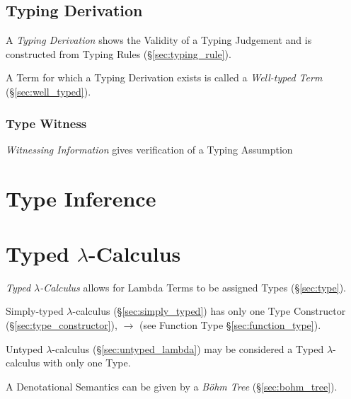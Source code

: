 \subsection{Typing Derivation}\label{sec:typing_derivation}

A \emph{Typing Derivation} shows the Validity of a Typing Judgement
and is constructed from Typing Rules (\S\ref{sec:typing_rule}).

A Term for which a Typing Derivation exists is called a
\emph{Well-typed Term} (\S\ref{sec:well_typed}).



\subsubsection{Type Witness}\label{sec:type_witness}

\emph{Witnessing Information} gives verification of a Typing
Assumption



\section{Type Inference}\label{sec:type_inference}



\section{Typed $\lambda$-Calculus}\label{sec:typed_lambda}

\emph{Typed $\lambda$-Calculus} allows for Lambda Terms to be assigned
Types (\S\ref{sec:type}).

Simply-typed $\lambda$-calculus (\S\ref{sec:simply_typed}) has only
one Type Constructor (\S\ref{sec:type_constructor}), $\rightarrow$
(see Function Type \S\ref{sec:function_type}).

Untyped $\lambda$-calculus (\S\ref{sec:untyped_lambda}) may be
considered a Typed $\lambda$-calculus with only one Type.

A Denotational Semantics can be given by a \emph{B\"ohm Tree}
(\S\ref{sec:bohm_tree}).



